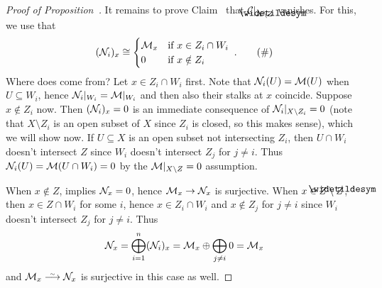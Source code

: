 \documentclass[a4paper,parskip=half,numbers=enddot, DIV=12]{scrreprt}
\begin{document}
\begin{proof}[Proof of Proposition~]
It remains to prove Claim~ that $\Cc|_{X\setminus \snake{Z}}$ vanishes. For this, we use that
\begin{align}\lbl{eq:stalksOfNn}
	(\Nn_i)_x\cong\begin{cases}
		\Mm_x & \text{if }x\in Z_i\cap W_i\\
		0 & \text{if }x\notin Z_i
	\end{cases}\;.\tag{\#}
\end{align}
Where does  come from? Let $x\in Z_i\cap W_i$ first. Note that $\mathcal{N}_i(U)=\mathcal{M}(U)$ when $U\subseteq W_i$, hence $\mathcal{N}_i|_{W_i}=\mathcal{M}|_{W_i}$ and then also their stalks at $x$ coincide. Suppose $x\notin Z_i$ now. Then $(\mathcal{N}_i)_x=0$ is an immediate  consequence of $\mathcal{N}_i|_{X\setminus Z_i}=0$ (note that $X\setminus Z_i$ is an open subset of $X$ since $Z_i$ is closed, so this makes sense), which we will show now. If $U\subseteq X$ is an open subset not intersecting $Z_i$, then $U\cap W_i$ doesn't intersect $Z$ since $W_i$ doesn't intersect $Z_j$ for $j\neq i$. Thus $\mathcal{N}_i(U)=\mathcal{M}(U\cap W_i)=0$ by the $\mathcal{M}|_{X\setminus Z}=0$ assumption.

When $x\notin Z$,  implies $\mathcal{N}_x=0$, hence $\Mm_x\morphism\Nn_x$ is surjective. When $x\in Z\setminus \snake{Z}$, then $x\in Z\cap W_i$ for some $i$, hence $x\in Z_i\cap W_i$ and $x\notin Z_j$ for $j\neq i$ since $W_i$ doesn't intersect $Z_j$ for $j\neq i$. Thus
\begin{align*}
	\mathcal{N}_x=\bigoplus_{i=1}^n(\mathcal{N}_i)_x=\mathcal{M}_x\oplus\bigoplus_{j\neq i}0 =\mathcal{M}_x
\end{align*}
and $\Mm_x\isomorphism\Nn_x$ is surjective in this case as well.
\end{proof}
\end{document}
